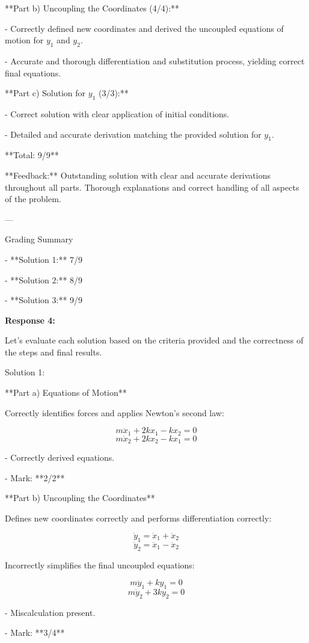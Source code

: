 \documentclass[a4paper,11pt]{article}
\begin{document}
**Part b) Uncoupling the Coordinates (4/4):**

- Correctly defined new coordinates and derived the uncoupled equations of motion for \( y_1 \) and \( y_2 \).

- Accurate and thorough differentiation and substitution process, yielding correct final equations.

**Part c) Solution for \( y_1 \) (3/3):**

- Correct solution with clear application of initial conditions.

- Detailed and accurate derivation matching the provided solution for \( y_1 \).

**Total: 9/9**

**Feedback:** Outstanding solution with clear and accurate derivations throughout all parts. Thorough explanations and correct handling of all aspects of the problem.

---

Grading Summary

- **Solution 1:** 7/9

- **Solution 2:** 8/9

- **Solution 3:** 9/9

\bigskip
\textbf{Response 4:}

Let's evaluate each solution based on the criteria provided and the correctness of the steps and final results.

Solution 1:

**Part a) Equations of Motion**

Correctly identifies forces and applies Newton's second law:

\[ m \ddot{x}_{1} + 2kx_{1} - kx_{2} = 0 \]
\[ m \ddot{x}_{2} + 2kx_{2} - kx_{1} = 0 \]

- Correctly derived equations. 

- Mark: **2/2**

**Part b) Uncoupling the Coordinates**

Defines new coordinates correctly and performs differentiation correctly:

\[ \ddot{y}_{1} = \ddot{x}_{1} + \ddot{x}_{2} \]
\[ \ddot{y}_{2} = \ddot{x}_{1} - \ddot{x}_{2} \]

Incorrectly simplifies the final uncoupled equations:

\[ m \ddot{y}_{1} + ky_{1} = 0 \]
\[ m \ddot{y}_{2} + 3ky_{2} = 0 \]

- Miscalculation present. 

- Mark: **3/4**
\end{document}
